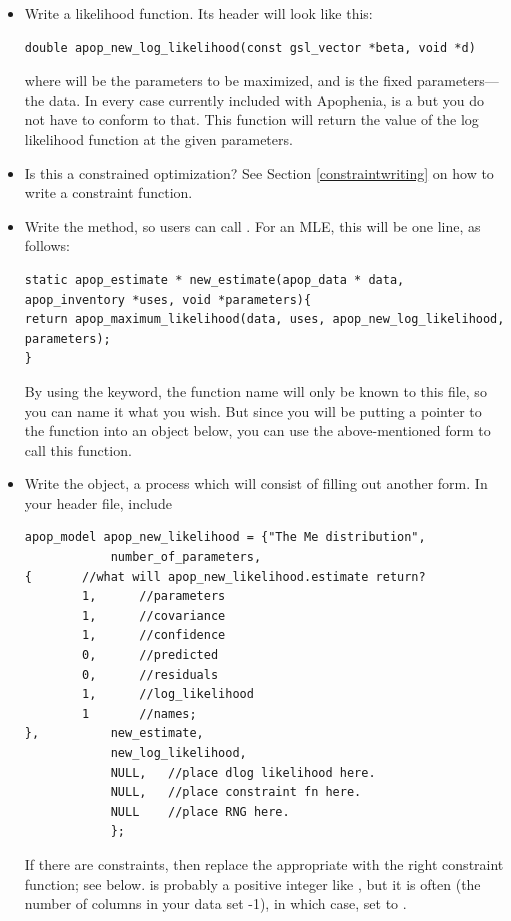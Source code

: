 \begin{itemize}
\item Write a likelihood function. Its header will look like this:
\begin{lstlisting}
double apop_new_log_likelihood(const gsl_vector *beta, void *d)
\end{lstlisting}
where  will be the parameters to be maximized, and  is the fixed parameters---the data. In every case currently included
with Apophenia,  is a  but you do not have to conform
to that. This function will return the value of the log likelihood function at the given parameters.

\item Is this a constrained optimization? See Section
\ref{constraintwriting} on how to write a constraint function.

\item Write the  method, so users can call 
. For an MLE, this will be one line,
as follows:
\begin{lstlisting}
static apop_estimate * new_estimate(apop_data * data, apop_inventory *uses, void *parameters){
return apop_maximum_likelihood(data, uses, apop_new_log_likelihood, parameters);
}
\end{lstlisting}
By using the  keyword, the function name will only be
known to this file, so you can name it what you wish.  But since you
will be putting a pointer to the function into an object below, you
can use the above-mentioned 
form to call this function. 


\item Write the object, a process which will consist of filling out
another form. In your header file, include 
\begin{lstlisting}
apop_model apop_new_likelihood = {"The Me distribution", 
            number_of_parameters, 
{       //what will apop_new_likelihood.estimate return?
        1,      //parameters 
        1,      //covariance
        1,      //confidence
        0,      //predicted
        0,      //residuals
        1,      //log_likelihood
        1       //names;
},          new_estimate,
            new_log_likelihood, 
            NULL,   //place dlog likelihood here.
            NULL,   //place constraint fn here.
            NULL    //place RNG here.
            };
\end{lstlisting}
If there are constraints, then replace the appropriate  with the right constraint function; see below.
 is probably a positive integer like , but
it is often (the number of columns in your data set -1), in which case,
set  to .


\end{itemize}
